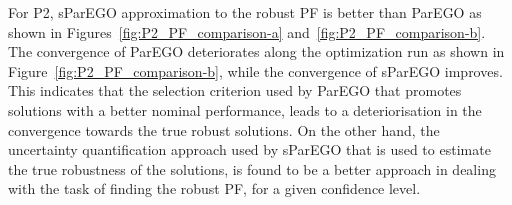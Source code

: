 \documentclass{llncs}
\begin{document}
For P2, sParEGO approximation to the robust PF is better than ParEGO as shown in Figures~\ref{fig:P2_PF_comparison-a} and~\ref{fig:P2_PF_comparison-b}. The convergence of ParEGO deteriorates along the optimization run as shown in Figure~\ref{fig:P2_PF_comparison-b}, while the convergence of sParEGO improves. This indicates that the selection criterion used by ParEGO that promotes solutions with a better nominal performance, leads to a deteriorisation in the convergence towards the true robust solutions. On the other hand, the uncertainty quantification approach used by sParEGO that is used to estimate the true robustness of the solutions, is found to be a better approach in dealing with the task of finding the robust PF, for a given confidence level.

\begin{figure}
\centering
{}
\hspace{1cm}
\\
\end{figure}
\end{document}

